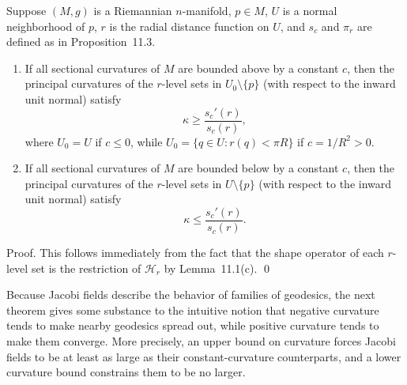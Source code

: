 \begin{corollary}
\label{cor:principal-curvature-comparison}

Suppose $(M,g)$ is a Riemannian $n$-manifold, $p \in M$, $U$ is a normal neighborhood of $p$, $r$ is the radial distance function on $U$, and $s_c$ and $\pi_r$ are defined as in Proposition~11.3.

\begin{enumerate}
\item[(a)] If all sectional curvatures of $M$ are bounded above by a constant $c$, then the principal curvatures of the $r$-level sets in $U_0 \setminus \{p\}$ (with respect to the inward unit normal) satisfy
\begin{equation*}
\kappa \geq \frac{s_c'(r)}{s_c(r)},
\end{equation*}
where $U_0 = U$ if $c \leq 0$, while $U_0 = \{q \in U : r(q) < \pi R\}$ if $c = 1/R^2 > 0$.

\item[(b)] If all sectional curvatures of $M$ are bounded below by a constant $c$, then the principal curvatures of the $r$-level sets in $U \setminus \{p\}$ (with respect to the inward unit normal) satisfy
\begin{equation*}
\kappa \leq \frac{s_c'(r)}{s_c(r)}.
\end{equation*}
\end{enumerate}

Proof. This follows immediately from the fact that the shape operator of each $r$-level set is the restriction of $\mathcal{H}_r$ by Lemma~11.1(c). \qed
\end{corollary}

Because Jacobi fields describe the behavior of families of geodesics, the next theorem gives some substance to the intuitive notion that negative curvature tends to make nearby geodesics spread out, while positive curvature tends to make them converge. More precisely, an upper bound on curvature forces Jacobi fields to be at least as large as their constant-curvature counterparts, and a lower curvature bound constrains them to be no larger.


